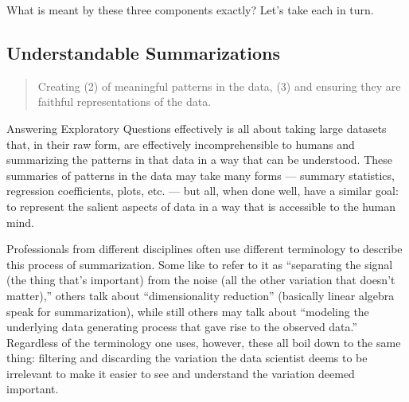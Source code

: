 \documentclass[letterpaper,10pt,english]{jupyterBook}
\begin{document}
\sphinxAtStartPar
What is meant by these three components exactly? Let’s take each in turn.


\subsection{Understandable Summarizations}
\label{\detokenize{30_questions/15_answering_exploratory_questions:understandable-summarizations}}\begin{quote}

\sphinxAtStartPar
Creating  (2) of meaningful patterns in the data, (3) and ensuring they are faithful representations of the data.
\end{quote}

\sphinxAtStartPar
Answering Exploratory Questions effectively is all about taking large datasets that, in their raw form, are effectively incomprehensible to humans and summarizing the patterns in that data in a way that can be understood. These summaries of patterns in the data may take many forms — summary statistics, regression coefficients, plots, etc. — but all, when done well, have a similar goal: to represent the salient aspects of data in a way that is accessible to the human mind.

\sphinxAtStartPar
Professionals from different disciplines often use different terminology to describe this process of summarization. Some like to refer to it as “separating the signal (the thing that’s important) from the noise (all the other variation that doesn’t matter),” others talk about “dimensionality reduction” (basically linear algebra speak for summarization), while still others may talk about “modeling the underlying data generating process that gave rise to the observed data.” Regardless of the terminology one uses, however, these all boil down to the same thing: filtering and discarding the variation the data scientist deems to be irrelevant to make it easier to see and understand the variation deemed important.
\end{document}
